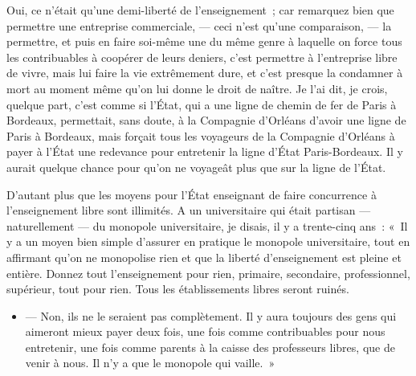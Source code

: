 \documentclass[french,twoside]{book} %
\begin{document}
Oui, ce n’était qu’une demi-liberté de l’enseignement ; car remarquez bien que permettre une entreprise commerciale, — ceci n’est qu’une comparaison, — la permettre, et puis en faire soi-même une du même genre à laquelle on force tous les contribuables à coopérer de leurs deniers, c’est permettre à l’entreprise libre de vivre, mais lui faire la vie extrêmement dure, et c’est presque la condamner à mort au moment même qu’on lui donne le droit de naître. Je l’ai dit, je crois, quelque part, c’est comme si l’État, qui a une ligne de chemin de fer de Paris à Bordeaux, permettait, sans doute, à la Compagnie d’Orléans d’avoir une ligne de Paris à Bordeaux, mais forçait tous les  voyageurs de la Compagnie d’Orléans à payer à l’État une redevance pour entretenir la ligne d’État Paris-Bordeaux. Il y aurait quelque chance pour qu’on ne voyageât plus que sur la ligne de l’État.\par
D’autant plus que les moyens pour l’État enseignant de faire concurrence à l’enseignement libre sont illimités. A un universitaire qui était partisan — naturellement — du monopole universitaire, je disais, il y a trente-cinq ans : « Il y a un moyen bien simple d’assurer en pratique le monopole universitaire, tout en affirmant qu’on ne monopolise rien et que la liberté d’enseignement est pleine et entière. Donnez tout l’enseignement pour rien, primaire, secondaire, professionnel, supérieur, tout pour rien. Tous les établissements libres seront ruinés.\par

\begin{itemize}[itemsep=0pt,]
\item  — Non, ils ne le seraient pas complètement. Il y aura toujours des gens qui aimeront mieux payer deux fois, une fois comme contribuables pour nous entretenir, une fois comme parents à la caisse des professeurs libres, que de venir à nous. Il n’y a que le monopole qui vaille. »
\end{itemize}
\end{document}
